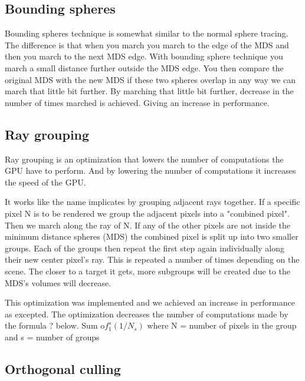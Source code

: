 		\subsection{Bounding spheres}
	
			Bounding spheres technique is somewhat similar to the normal sphere
			tracing. The difference is that when you march you march to the
			edge of the MDS and then you march to the next MDS edge. With
			bounding sphere technique you march a small distance further
			outside the MDS edge. You then compare the original MDS with the
			new MDS if these two spheres overlap in any way we can march that
			little bit further. By marching that little bit further, decrease
			in the number of times marched is achieved. Giving an increase in
			performance. 
			
		

		\subsection{Ray grouping}
		
			Ray grouping is an optimization that lowers the number of
			computations the GPU have to perform. And by lowering the number of
			computations it increases the speed of the GPU.
			
			It works like the name implicates by grouping adjacent rays
			together. If a specific pixel N is to be rendered we group the
			adjacent pixels into a "combined pixel". Then we march along the
			ray of N. If any of the other pixels are not inside the minimum
			distance spheres (MDS) the combined pixel is split up into two
			smaller groups. Each of the groups then repeat the first step again
			individually along their new center pixel's ray. This is repeated a
			number of times depending on the scene.  The closer to a target it
			gets, more subgroups will be created due to the MDS's volumes will
			decrease.
			
			This optimization was implemented and we achieved an increase in
			performance as excepted. The optimization decreases the number of
			computations made by the formula ? below.  Sum o$f_1^s(1/N_s)$
			where N = number of pixels in the group and s = number of groups


		\subsection{Orthogonal culling}


